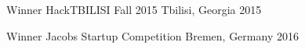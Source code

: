 \begin{cvhonors}

  \cvhonor
    {Winner} %
    {HackTBILISI Fall 2015} %
    {Tbilisi, Georgia} %
    {2015} %

  \cvhonor
    {Winner} %
    {Jacobs Startup Competition} %
    {Bremen, Germany} %
    {2016} %

\end{cvhonors}